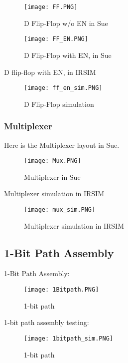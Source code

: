 \documentclass{article}
\begin{document}
\begin{figure}[H]
    \centering
    \texttt{[image: FF.PNG]}
    \caption{D Flip-Flop w/o EN in Sue}
    \label{fig:ff_sue}
\end{figure}

\begin{figure}[H]
    \centering
    \texttt{[image: FF\_EN.PNG]}
    \caption{D Flip-Flop with EN, in Sue}
    \label{fig:ff_en_sue}
\end{figure}

D flip-flop with EN, in IRSIM

\begin{figure}[H]
    \centering
    \texttt{[image: ff\_en\_sim.PNG]}
    \caption{D Flip-Flop simulation}
    \label{fig:ff_en_sim}
\end{figure}

\subsubsection{Multiplexer}
Here is the Multiplexer layout in Sue.

\begin{figure}[H]
    \centering
    \texttt{[image: Mux.PNG]}
    \caption{Multiplexer in Sue}
    \label{fig:mux_sue}
\end{figure}

Multiplexer simulation in IRSIM

\begin{figure}[H]
    \centering
    \texttt{[image: mux\_sim.PNG]}
    \caption{Multiplexer simulation in IRSIM}
    \label{fig:mux_sim}
\end{figure}


\subsection{1-Bit Path Assembly}
1-Bit Path Assembly:
\begin{figure}[H]
    \centering
    \texttt{[image: 1Bitpath.PNG]}
    \caption{1-bit path}
    \label{fig:1bit_sue}
\end{figure}

1-bit path assembly testing:

\begin{figure}[H]
    \centering
    \texttt{[image: 1bitpath\_sim.PNG]}
    \caption{1-bit path}
    \label{fig:1bitpath_sim}
\end{figure}
\end{document}
